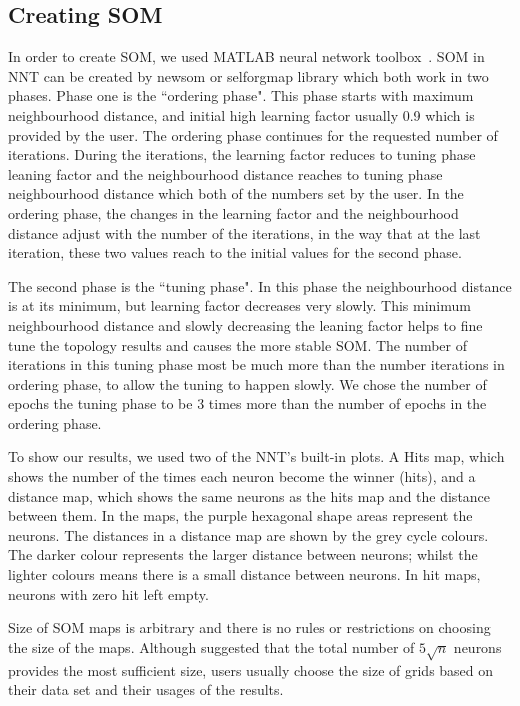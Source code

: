 \subsection{Creating SOM}
\label{sec: create_som}
     In order to create SOM, we used {\tiny MATLAB} neural network %
     toolbox~\citep[NNT,][]{matlabtolbox}.
     SOM in {\tiny NNT} can be created by {\tiny newsom} or {\tiny selforgmap} library which both work in two phases. 
     Phase one is the ``ordering phase". 
     This phase starts with maximum neighbourhood distance, and initial high learning factor usually 0.9 which is provided by the user. 
     The ordering phase continues for the requested number of iterations.
     During the iterations, the learning factor reduces to tuning phase leaning factor and the neighbourhood distance reaches to tuning phase neighbourhood distance which both of the numbers set by the user.
     In the ordering phase, the changes in the learning factor and the neighbourhood distance adjust with the number of the iterations, in the way that at the last iteration, these two values reach to the initial values for the second phase.
     
     The second phase is the ``tuning phase".
     In this phase the neighbourhood distance is at its minimum, but learning factor decreases very slowly.
     This minimum neighbourhood distance and slowly decreasing the leaning factor helps to fine tune the topology results and causes the more stable SOM. 
     The number of iterations in this tuning phase most be much more than the number iterations in ordering phase, to allow the tuning to happen slowly. %
     We chose the number of epochs the tuning phase to be 3 times more than the number of epochs in the ordering phase.
     
     To show our results, we used two of the {\tiny NNT}'s built-in plots. 
     A Hits map, which shows the number of the times each neuron become the winner (hits), and a distance map, which shows the same neurons as the hits map and the distance between them.
     In the maps, the purple hexagonal shape areas represent the neurons.
     The distances in a distance map are shown by the grey cycle colours.
     The darker colour represents the larger distance between neurons; whilst the lighter colours means there is a small distance between neurons.
     In hit maps, neurons with zero hit left empty.
      
    Size of SOM maps is arbitrary and there is no rules or restrictions on choosing the size of the maps. 
    Although \cite{Vesanto05} suggested that the total number of  $5\sqrt{n}$ neurons provides the most sufficient size, users usually choose the size of grids based on their data set and their usages of the results.

